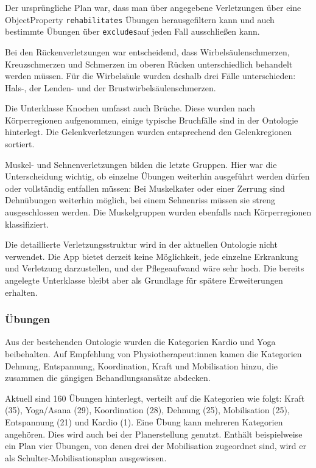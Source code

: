 Der ursprüngliche Plan war, dass man über angegebene Verletzungen über eine
 ObjectProperty \texttt{rehabilitates} Übungen herausgefiltern kann und auch
 bestimmte Übungen über \texttt{excludes}auf jeden Fall ausschließen kann.

Bei den Rückenverletzungen war
entscheidend, dass Wirbelsäulenschmerzen, Kreuzschmerzen und Schmerzen im
oberen Rücken unterschiedlich behandelt werden müssen. Für die Wirbelsäule
wurden deshalb drei Fälle unterschieden: Hals-, der Lenden- und der
Brustwirbelsäulenschmerzen.

Die Unterklasse Knochen umfasst
auch Brüche. Diese wurden nach Körperregionen aufgenommen, einige typische
Bruchfälle sind in der Ontologie hinterlegt. Die Gelenkverletzungen wurden
entsprechend den Gelenkregionen sortiert.

Muskel- und Sehnenverletzungen
bilden die letzte Gruppen. Hier war die Unterscheidung wichtig, ob einzelne
Übungen weiterhin ausgeführt werden dürfen oder vollständig entfallen müssen:
Bei Muskelkater oder einer Zerrung sind Dehnübungen weiterhin möglich, bei
einem Sehnenriss müssen sie streng ausgeschlossen werden. Die Muskelgruppen
wurden ebenfalls nach Körperregionen klassifiziert.

Die detaillierte
Verletzungsstruktur wird in der aktuellen Ontologie nicht verwendet. Die App
bietet derzeit keine Möglichkeit, jede einzelne Erkrankung und Verletzung
darzustellen, und der Pflegeaufwand wäre sehr hoch. Die bereits angelegte Unterklasse
bleibt aber als Grundlage für spätere Erweiterungen erhalten.

\subsubsection{Übungen}

Aus der bestehenden Ontologie
wurden die Kategorien Kardio und Yoga beibehalten. Auf Empfehlung von
Physiotherapeut:innen kamen die Kategorien Dehnung,
Entspannung, Koordination, Kraft und Mobilisation hinzu, die zusammen die
gängigen Behandlungsansätze abdecken.

Aktuell sind 160 Übungen
hinterlegt, verteilt auf die Kategorien wie folgt: Kraft (35), Yoga/Asana (29),
Koordination (28), Dehnung (25), Mobilisation (25), Entspannung (21) und
Kardio (1). Eine Übung kann mehreren Kategorien angehören. Dies wird auch bei
der Planerstellung genutzt. Enthält beispielweise ein Plan vier Übungen, von denen drei der
Mobilisation zugeordnet sind, wird er als Schulter-Mobilisationsplan
ausgewiesen.

